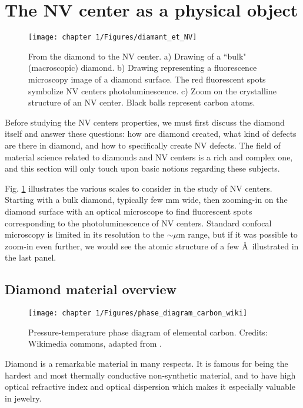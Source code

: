 \documentclass[a4paper, 11pt]{report}
\begin{document}
\section{The NV center as a physical object}
\begin{figure}[h!]
\centering
\texttt{[image: chapter 1/Figures/diamant\_et\_NV]}
\caption{From the diamond to the NV center. a) Drawing of a ``bulk" (macroscopic) diamond. b) Drawing representing a fluorescence microscopy image of a diamond surface. The red fluorescent spots symbolize NV centers photoluminescence. c) Zoom on the crystalline structure of an NV center. Black balls represent carbon atoms.}
\label{diamond+NV}
\end{figure}
Before studying the NV centers properties, we must first discuss the diamond itself and answer these questions: how are diamond created, what kind of defects are there in diamond, and how to specifically create NV defects. The field of material science related to diamonds and NV centers is a rich and complex one, and this section will only touch upon basic notions regarding these subjects.

Fig. \ref{diamond+NV} illustrates the various scales to consider in the study of NV centers. Starting with a bulk diamond, typically few mm wide, then zooming-in on the diamond surface with an optical microscope to find fluorescent spots corresponding to the photoluminescence of NV centers. Standard confocal microscopy is limited in its resolution to the $\sim \mu$m range, but if it was possible to zoom-in even further, we would see the atomic structure of a few \AA \ illustrated in the last panel. 
\subsection{Diamond material overview}
\begin{figure}[h!]
\centering
\texttt{[image: chapter 1/Figures/phase\_diagram\_carbon\_wiki]}
\caption{Pressure-temperature phase diagram of elemental carbon. Credits: Wikimedia commons, adapted from \citep{bundy1989pressure, bundy1996pressure}.}
\label{carbon phase diagram}
\end{figure}

Diamond is a remarkable material in many respects. It is famous for being the hardest and most thermally conductive non-synthetic material, and to have high optical refractive index and optical dispersion which makes it especially valuable in jewelry.
\end{document}
